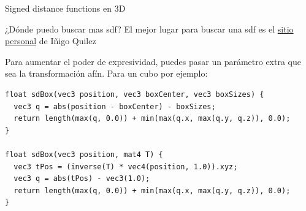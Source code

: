 \begin{frame}[fragile]{Signed distance functions en 3D}
\begin{block}{¿Dónde puedo buscar mas sdf?}
    El mejor lugar para buscar una sdf es el \href{https://iquilezles.org/articles/distfunctions/}{sitio personal} de Iñigo Quilez
\end{block}
Para aumentar el poder de expresividad, puedes pasar un parámetro extra que sea la transformación afín.
Para un cubo por ejemplo:
\begin{listing}
\begin{verbatim}
float sdBox(vec3 position, vec3 boxCenter, vec3 boxSizes) {
  vec3 q = abs(position - boxCenter) - boxSizes;
  return length(max(q, 0.0)) + min(max(q.x, max(q.y, q.z)), 0.0);
}

float sdBox(vec3 position, mat4 T) {
  vec3 tPos = (inverse(T) * vec4(position, 1.0)).xyz;
  vec3 q = abs(tPos) - vec3(1.0);
  return length(max(q, 0.0)) + min(max(q.x, max(q.y, q.z)), 0.0);
}
\end{verbatim}
\end{listing}

\end{frame}

